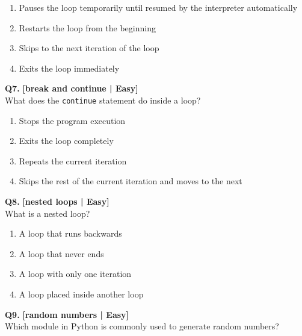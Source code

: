 \begin{enumerate}[label=(\alph*),topsep=2pt,itemsep=1pt,partopsep=0pt,parsep=0pt]
    \item \relax Pauses the loop temporarily until resumed by the interpreter automatically
    \item \relax Restarts the loop from the beginning
    \item \relax Skips to the next iteration of the loop
    \item \relax Exits the loop immediately
\end{enumerate}
\vspace{2mm}

\noindent\textbf{Q7.} \hfill {\small\color{LPUOrange}\textbf{[break and continue | Easy]}}\\[2pt]
What does the \texttt{continue} statement do inside a loop?

\begin{enumerate}[label=(\alph*),topsep=2pt,itemsep=1pt,partopsep=0pt,parsep=0pt]
    \item \relax Stops the program execution
    \item \relax Exits the loop completely
    \item \relax Repeats the current iteration
    \item \relax Skips the rest of the current iteration and moves to the next
\end{enumerate}
\vspace{2mm}

\noindent\textbf{Q8.} \hfill {\small\color{LPUOrange}\textbf{[nested loops | Easy]}}\\[2pt]
What is a nested loop?

\begin{enumerate}[label=(\alph*),topsep=2pt,itemsep=1pt,partopsep=0pt,parsep=0pt]
    \item \relax A loop that runs backwards
    \item \relax A loop that never ends
    \item \relax A loop with only one iteration
    \item \relax A loop placed inside another loop
\end{enumerate}
\vspace{2mm}

\noindent\textbf{Q9.} \hfill {\small\color{LPUOrange}\textbf{[random numbers | Easy]}}\\[2pt]
Which module in Python is commonly used to generate random numbers?

